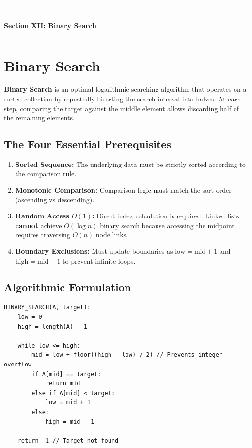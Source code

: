 \newpage
\begin{center}
\vspace{0.5em}
{\color{primary}\rule{0.45\textwidth}{1.2pt}}\\[4pt]
{\Large\bfseries\color{primary} Section XII: Binary Search}\\[2pt]
{\color{primary}\rule{0.45\textwidth}{1.2pt}}
\vspace{0.5em}
\end{center}

\section{Binary Search}

\textbf{Binary Search} is an optimal logarithmic searching algorithm that operates on a sorted collection by repeatedly bisecting the search interval into halves. At each step, comparing the target against the middle element allows discarding half of the remaining elements.

\subsection{The Four Essential Prerequisites}
\begin{enumerate}
    \item \textbf{Sorted Sequence:} The underlying data must be strictly sorted according to the comparison rule.
    \item \textbf{Monotonic Comparison:} Comparison logic must match the sort order (ascending vs descending).
    \item \textbf{Random Access $O(1)$:} Direct index calculation is required. Linked lists \textbf{cannot} achieve $O(\log n)$ binary search because accessing the midpoint requires traversing $O(n)$ node links.
    \item \textbf{Boundary Exclusions:} Must update boundaries as $\text{low} = \text{mid} + 1$ and $\text{high} = \text{mid} - 1$ to prevent infinite loops.
\end{enumerate}

\subsection{Algorithmic Formulation}

\begin{lstlisting}[style=pseudocode, caption={Binary Search Algorithm.}]
BINARY_SEARCH(A, target):
    low = 0
    high = length(A) - 1

    while low <= high:
        mid = low + floor((high - low) / 2) // Prevents integer overflow
        if A[mid] == target:
            return mid
        else if A[mid] < target:
            low = mid + 1
        else:
            high = mid - 1

    return -1 // Target not found
\end{lstlisting}

